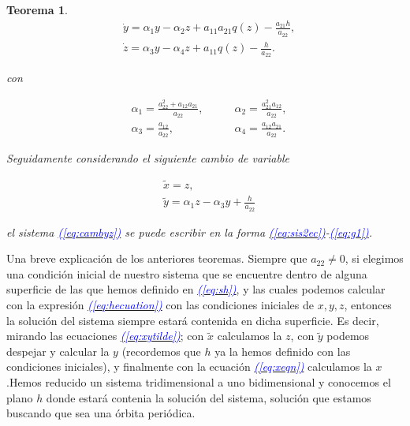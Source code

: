 \documentclass[12pt,a4paper]{report} %
\newtheorem{theorem}{Teorema}[chapter]
\newcommand{\eref}[1]{\hyperref[#1]{\textcolor{blue}{\textit{(\ref*{#1})}}}}
\begin{document}
\begin{theorem}
		\begin{equation}
			\label{eq:cambyz}
			\begin{aligned}
				&\dot{y}=\alpha_1y-\alpha_2z+a_{11}a_{21}q(z)-\frac{a_{21}h}{a_{22}}, \\[2mm]
				&\dot{z}=\alpha_3y-\alpha_4z+a_{11}q(z)-\frac{h}{a_{22}}.
			\end{aligned}
		\end{equation}
		
		con
		
		\begin{equation}
			\label{eq:alphamatriz}
			\begin{aligned}
				&\alpha_1=\frac{a_{22}^2+a_{12}a_{21}}{a_{22}}, \qquad &\alpha_2=\frac{a_{21}^2a_{12}}{a_{22}},\\[2mm]
				&\alpha_3=\frac{a_{12}}{a_{22}}, \qquad &\alpha_4=\frac{a_{12}a_{21}}{a_{22}}.
			\end{aligned}
		\end{equation}\smallskip
		
		Seguidamente considerando el siguiente cambio de variable
		
		\begin{equation}
			\label{eq:xytilde}
			\begin{aligned}
				&\tilde{x}=z, \\[2mm]
				&\tilde{y}=\alpha_1z-\alpha_3y+\frac{h}{a_{22}}
			\end{aligned}
		\end{equation}\smallskip
		
		 el sistema \eref{eq:cambyz} se puede escribir en la forma \eref{eq:sis2ec}-\eref{eq:g1}.
		
	\end{theorem}
	
	\vspace{0.5cm}Una breve explicación de los anteriores teoremas. Siempre que $a_{22}\neq 0$, si elegimos una condición inicial de nuestro sistema que se encuentre dentro de alguna superficie de las que hemos definido en \eref{eq:sh}, y las cuales podemos calcular con la expresión \eref{eq:hecuation} con las condiciones iniciales de $x,y,z$, entonces la solución del sistema siempre estará contenida en dicha superficie. Es decir, mirando las ecuaciones \eref{eq:xytilde}; con $\tilde{x}$ calculamos la $z$, con $\tilde{y}$ podemos despejar y calcular la $y$ (recordemos que $h$ ya la hemos definido con las condiciones iniciales), y finalmente con la ecuación \eref{eq:xeqn} calculamos la $x$ .Hemos reducido un sistema tridimensional a uno bidimensional y conocemos el plano $h$ donde estará contenia la solución del sistema, solución que estamos buscando que sea una órbita periódica.
	
\end{document}
